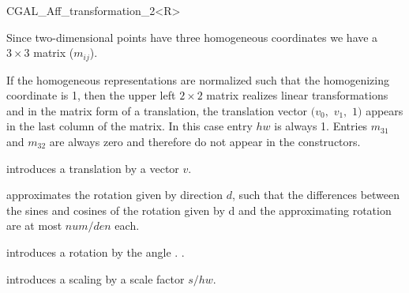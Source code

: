 \begin{classtemplate}{CGAL_Aff_transformation_2<R>}

Since two-dimensional points have three 
homogeneous coordinates we have a $3\times 3$ matrix ($m_{ij}$).

If the homogeneous representations are normalized such that the 
homogenizing coordinate is 1, then the upper left $2\times 2$ matrix realizes
linear transformations and in the matrix form of a translation,  the
translation vector $(v_0,$ $v_1,$ $1)$ appears in the last column of the 
matrix. In this case entry $hw$ is always 1.
Entries $m_{31}$ and $m_{32}$ are always zero and therefore do not appear in
the constructors.

\creation
{}

            {introduces a translation by a vector $v$.}

            {approximates the rotation given by direction $d$,
             such that the differences between the sines and cosines
             of the rotation given by d and the approximating rotation
             are at most $num/den$ each.}

            {introduces a rotation by the angle .
             \precond {}}.

            {introduces a scaling by a scale factor $s/hw$.}

\newsavebox{\arr}
\newsavebox{\arrlin}
\newsavebox{\transvec}



\end{classtemplate}
